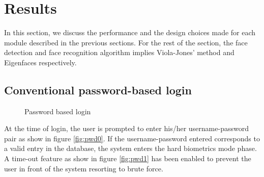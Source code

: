 \documentclass[12pt]{report}			%
\begin{document}
\newpage
\chapter{ Results }

In this section, we discuss the performance and the design choices made for each module described in the previous sections.
For the rest of the section, the face detection and face recognition algorithm implies Viola-Jones' method and Eigenfaces respectively.

\section{Conventional password-based login}
\begin{figure}
	\centering
	\quad
	\caption{Password based login}
\end{figure}

At the time of login, the user is prompted to enter his/her username-password pair as show  in figure \ref{fig:pwd0}.
If the username-password entered corresponds to a valid entry in the database, the system enters the hard biometrics mode phase.
A time-out feature as show in figure \ref{fig:pwd1} has been enabled to prevent the user in front of the system resorting to brute force. 
\end{document}
